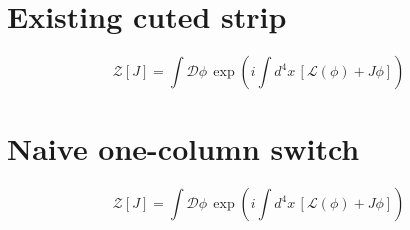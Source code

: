 \documentclass[twocolumn]{article}
\begin{document}
\section{Existing cuted strip}
\WBTextA
\begin{strip}
\begin{equation}
 \mathcal Z[J]=\int\mathcal D\phi\,
 \exp\!\left(i\int d^4x\,[\mathcal L(\phi)+J\phi]\right)
\end{equation}
\end{strip}
\WBTextB\WBTextC

\clearpage
\section{Naive one-column switch}
\WBTextA
\onecolumn
\begin{equation}
 \mathcal Z[J]=\int\mathcal D\phi\,
 \exp\!\left(i\int d^4x\,[\mathcal L(\phi)+J\phi]\right)
\end{equation}
\twocolumn
\WBTextB\WBTextC
\end{document}
